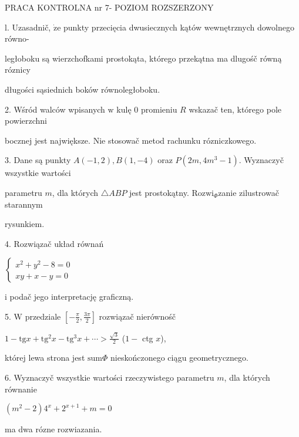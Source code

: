 \documentclass[a4paper,12pt]{article}
\begin{document}
PRACA KONTROLNA nr 7- POZIOM ROZSZERZONY

l. Uzasadnič, $\dot{\mathrm{z}}\mathrm{e}$ punkty przecięcia dwusiecznych kątów wewnętrznych dowolnego równo-

ległoboku są wierzchofkami prostokąta, którego przekątna ma dlugośč równą róznicy

długości sąsiednich boków równoległoboku.

2. Wśród walców wpisanych $\mathrm{w}$ kulę $0$ promieniu $R$ wskazač ten, którego pole powierzchni

bocznej jest największe. Nie stosowač metod rachunku rózniczkowego.

3. Dane są punkty $A(-1,2), B(1,-4)$ oraz $P(2m,4m^{3}-1)$. Wyznaczyč wszystkie wartości

parametru $m$, dla których $\triangle ABP$ jest prostokątny. $\mathrm{R}\mathrm{o}\mathrm{z}\mathrm{w}\mathrm{i}_{\Phi}$zanie zilustrowač starannym

rysunkiem.

4. Rozwiązač układ równań

$\left\{\begin{array}{l}
x^{2}+y^{2}-8=0\\
xy+x-y=0
\end{array}\right.$

$\mathrm{i}$ podač jego interpretację graficzną.

5. $\mathrm{W}$ przedziale $[-\displaystyle \frac{\pi}{2},\frac{3\pi}{2}]$ rozwiązač nierównośč

$1-\displaystyle \mathrm{t}\mathrm{g}x+\mathrm{t}\mathrm{g}^{2}x-\mathrm{t}\mathrm{g}^{3}x+\cdots>\frac{\sqrt{3}}{2}$ ($1-$ ctg $x$),

której lewa strona jest $\mathrm{s}\mathrm{u}\mathrm{m}\Phi$ nieskończonego ciągu geometrycznego.

6. Wyznaczyč wszystkie wartości rzeczywistego parametru $m$, dla których równanie

$(m^{2}-2)4^{x}+2^{x+1}+m=0$

ma dwa rózne rozwiazania.
\end{document}
